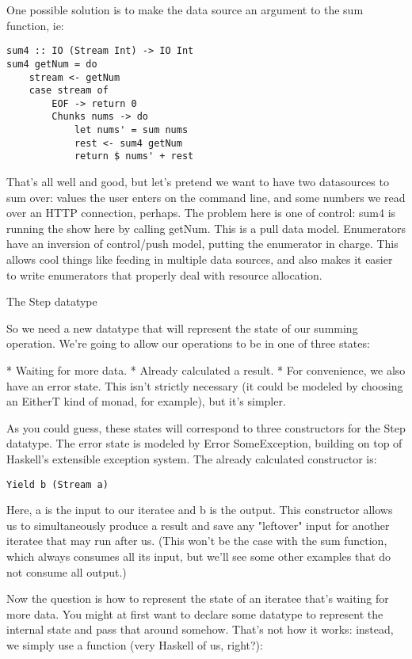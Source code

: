 One possible solution is to make the data source an argument to the sum function, ie:

\begin{lstlisting}
sum4 :: IO (Stream Int) -> IO Int
sum4 getNum = do
    stream <- getNum
    case stream of
        EOF -> return 0
        Chunks nums -> do
            let nums' = sum nums
            rest <- sum4 getNum
            return $ nums' + rest
\end{lstlisting}

That's all well and good, but let's pretend we want to have two datasources to sum over: values the user enters on the command line, and some numbers we read over an HTTP connection, perhaps. The problem here is one of control: sum4 is running the show here by calling getNum. This is a pull data model. Enumerators have an inversion of control/push model, putting the enumerator in charge. This allows cool things like feeding in multiple data sources, and also makes it easier to write enumerators that properly deal with resource allocation.

The Step datatype

So we need a new datatype that will represent the state of our summing operation. We're going to allow our operations to be in one of three states:

* Waiting for more data.
* Already calculated a result.
* For convenience, we also have an error state. This isn't strictly necessary (it could be modeled by choosing an EitherT kind of monad, for example), but it's simpler.

As you could guess, these states will correspond to three constructors for the Step datatype. The error state is modeled by Error SomeException, building on top of Haskell's extensible exception system. The already calculated constructor is:

\begin{lstlisting}
Yield b (Stream a)
\end{lstlisting}

Here, a is the input to our iteratee and b is the output. This constructor allows us to simultaneously produce a result and save any "leftover" input for another iteratee that may run after us. (This won't be the case with the sum function, which always consumes all its input, but we'll see some other examples that do not consume all output.)

Now the question is how to represent the state of an iteratee that's waiting for more data. You might at first want to declare some datatype to represent the internal state and pass that around somehow. That's not how it works: instead, we simply use a function (very Haskell of us, right?):

